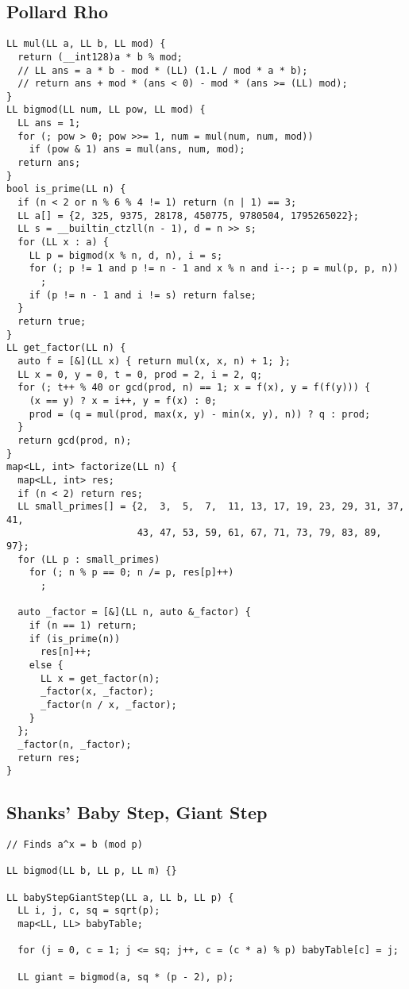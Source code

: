 \documentclass[FSZ,a4paper,onesided]{article}
\begin{document}
\begin{multicols*}{\COLS}
\subsection{Pollard Rho}
\begin{lstlisting}
LL mul(LL a, LL b, LL mod) {
  return (__int128)a * b % mod;
  // LL ans = a * b - mod * (LL) (1.L / mod * a * b);
  // return ans + mod * (ans < 0) - mod * (ans >= (LL) mod);
}
LL bigmod(LL num, LL pow, LL mod) {
  LL ans = 1;
  for (; pow > 0; pow >>= 1, num = mul(num, num, mod))
    if (pow & 1) ans = mul(ans, num, mod);
  return ans;
}
bool is_prime(LL n) {
  if (n < 2 or n % 6 % 4 != 1) return (n | 1) == 3;
  LL a[] = {2, 325, 9375, 28178, 450775, 9780504, 1795265022};
  LL s = __builtin_ctzll(n - 1), d = n >> s;
  for (LL x : a) {
    LL p = bigmod(x % n, d, n), i = s;
    for (; p != 1 and p != n - 1 and x % n and i--; p = mul(p, p, n))
      ;
    if (p != n - 1 and i != s) return false;
  }
  return true;
}
LL get_factor(LL n) {
  auto f = [&](LL x) { return mul(x, x, n) + 1; };
  LL x = 0, y = 0, t = 0, prod = 2, i = 2, q;
  for (; t++ % 40 or gcd(prod, n) == 1; x = f(x), y = f(f(y))) {
    (x == y) ? x = i++, y = f(x) : 0;
    prod = (q = mul(prod, max(x, y) - min(x, y), n)) ? q : prod;
  }
  return gcd(prod, n);
}
map<LL, int> factorize(LL n) {
  map<LL, int> res;
  if (n < 2) return res;
  LL small_primes[] = {2,  3,  5,  7,  11, 13, 17, 19, 23, 29, 31, 37, 41,
                       43, 47, 53, 59, 61, 67, 71, 73, 79, 83, 89, 97};
  for (LL p : small_primes)
    for (; n % p == 0; n /= p, res[p]++)
      ;

  auto _factor = [&](LL n, auto &_factor) {
    if (n == 1) return;
    if (is_prime(n))
      res[n]++;
    else {
      LL x = get_factor(n);
      _factor(x, _factor);
      _factor(n / x, _factor);
    }
  };
  _factor(n, _factor);
  return res;
}
\end{lstlisting}
\subsection{Shanks' Baby Step, Giant Step}
\begin{lstlisting}
// Finds a^x = b (mod p)

LL bigmod(LL b, LL p, LL m) {}

LL babyStepGiantStep(LL a, LL b, LL p) {
  LL i, j, c, sq = sqrt(p);
  map<LL, LL> babyTable;

  for (j = 0, c = 1; j <= sq; j++, c = (c * a) % p) babyTable[c] = j;

  LL giant = bigmod(a, sq * (p - 2), p);


\end{lstlisting}
\end{multicols*}
\end{document}
